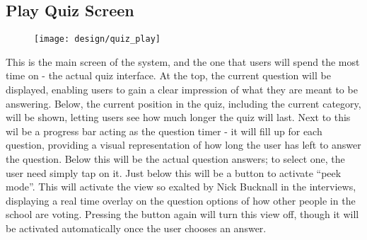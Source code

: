 \clearpage

\subsection{Play Quiz Screen}
\begin{figure}[h!]
  \texttt{[image: design/quiz\_play]}
\end{figure}

This is the main screen of the system, and the one that users will spend the most time on - the actual quiz interface. At the top, the current question will be displayed, enabling users to gain a clear impression of what they are meant to be answering. Below, the current position in the quiz, including the current category, will be shown, letting users see how much longer the quiz will last. Next to this wil be a progress bar acting as the question timer - it will fill up for each question, providing a visual representation of how long the user has left to answer the question. Below this will be the actual question answers; to select one, the user need simply tap on it. Just below this will be a button to activate ``peek mode''. This will activate the view so exalted by Nick Bucknall in the interviews, displaying a real time overlay on the question options of how other people in the school are voting. Pressing the button again will turn this view off, though it will be activated automatically once the user chooses an answer.
